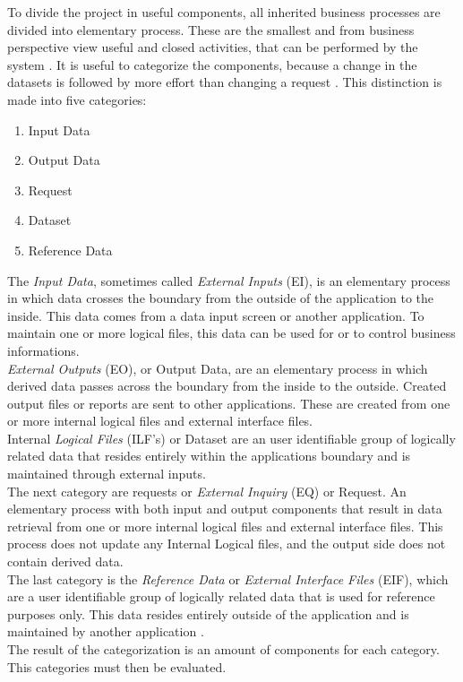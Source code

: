 To divide the project in useful components, all inherited business processes are divided into elementary process. These are the smallest and from business perspective view useful and closed activities, that can be performed by the system \cite{FPKompakt}. It is useful to categorize the components, because a change in the datasets is followed by more effort than changing a request \cite{itplanung}. This distinction is made into five categories:\\
\begin{enumerate}
	\item Input Data
	\item Output Data
	\item Request
	\item Dataset
	\item Reference Data
\end{enumerate}
The \textit{Input Data}, sometimes called \textit{External Inputs} (EI), is an elementary process in which data crosses the boundary from the outside of the application to the inside. This data comes from a data input screen or another application. To maintain one or more logical files, this data can be used for or to control business informations.\\
\textit{External Outputs} (EO), or Output Data, are an elementary process in which derived data passes across the boundary from the inside to the outside. Created output files or reports are sent to other applications. These are created from one or more internal logical files and external interface files.\\
Internal \textit{Logical Files} (ILF’s) or Dataset are an user identifiable group of logically related data that resides entirely within the applications boundary and is maintained through external inputs.\\
The next category are requests or \textit{External Inquiry} (EQ) or Request. An elementary process with both input and output components that result in data retrieval from one or more internal logical files and external interface files. This process does not update any Internal Logical files, and the output side does not contain derived data.\\
The last category is the \textit{Reference Data} or \textit{External Interface Files} (EIF), which are a user identifiable group of logically related data that is used for reference purposes only. This data resides entirely outside of the application and is maintained by another application \cite{fpafundamentals}.\\
The result of the categorization is an amount of components for each category. This categories must then be evaluated.

